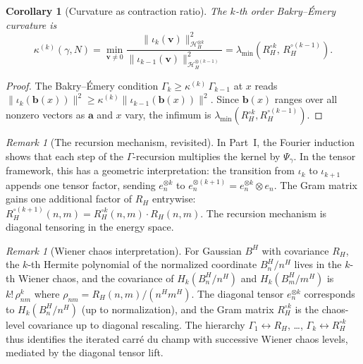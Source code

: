 \documentclass[11pt,a4paper]{article}
\theoremstyle{plain}
\newtheorem{corollary}[theorem]{Corollary}
\theoremstyle{definition}
\theoremstyle{remark}
\newtheorem{remark}[theorem]{Remark}
\newcommand{\HH}{\mathcal{H}_H}
\begin{document}
\begin{corollary}[Curvature as contraction ratio]
\label{cor:contraction}
The $k$-th order Bakry--\'Emery curvature is
\begin{equation}\label{eq:kappak}
  \kappa^{(k)}(\gamma,N)
  = \min_{\mathbf{v} \neq 0}
    \frac{\|\iota_k(\mathbf{v})\|^2_{\HH^{\otimes k}}}
         {\|\iota_{k-1}(\mathbf{v})\|^2_{\HH^{\otimes(k-1)}}}
  = \lambda_{\min}(R_H^{\circ k},\, R_H^{\circ(k-1)}).
\end{equation}
\end{corollary}

\begin{proof}
The Bakry--\'Emery condition
$\Gamma_k \geq \kappa^{(k)}\,\Gamma_{k-1}$
at $x$ reads
$\|\iota_k(\mathbf{b}(x))\|^2
\geq \kappa^{(k)}\|\iota_{k-1}(\mathbf{b}(x))\|^2$.
Since $\mathbf{b}(x)$ ranges over all nonzero vectors
as $\mathbf{a}$ and $x$ vary, the infimum is
$\lambda_{\min}(R_H^{\circ k}, R_H^{\circ(k-1)})$.
\end{proof}

\begin{remark}[The recursion mechanism, revisited]
\label{rem:recursion}
In Part~I, the Fourier induction shows that each step
of the $\Gamma$-recursion multiplies the kernel by
$\Psi_\gamma$.  In the tensor framework, this has a
geometric interpretation: the transition from
$\iota_k$ to $\iota_{k+1}$ appends one tensor factor,
sending $e_n^{\otimes k}$ to $e_n^{\otimes(k+1)}
= e_n^{\otimes k} \otimes e_n$.  The Gram matrix
gains one additional factor of $R_H$ entrywise:
$R_H^{\circ(k+1)}(n,m) = R_H^{\circ k}(n,m) \cdot R_H(n,m)$.
The recursion mechanism is diagonal tensoring in the
energy space.
\end{remark}

\begin{remark}[Wiener chaos interpretation]
\label{rem:chaos}
For Gaussian $B^H$ with covariance $R_H$, the
$k$-th Hermite polynomial of the normalized coordinate
$B_n^H / n^H$ lives in the $k$-th Wiener chaos, and the
covariance of $H_k(B_n^H/n^H)$ and $H_k(B_m^H/m^H)$
is $k!\,\rho_{nm}^k$ where
$\rho_{nm} = R_H(n,m)/(n^H m^H)$.
The diagonal tensor $e_n^{\otimes k}$ corresponds to
$H_k(B_n^H/n^H)$ (up to normalization), and the Gram
matrix $R_H^{\circ k}$ is the chaos-level covariance
up to diagonal rescaling.  The hierarchy
$\Gamma_1 \leftrightarrow R_H$, \ldots,
$\Gamma_k \leftrightarrow R_H^{\circ k}$
thus identifies the iterated carr\'e du champ with
successive Wiener chaos levels, mediated by the diagonal
tensor lift.
\end{remark}
\end{document}
